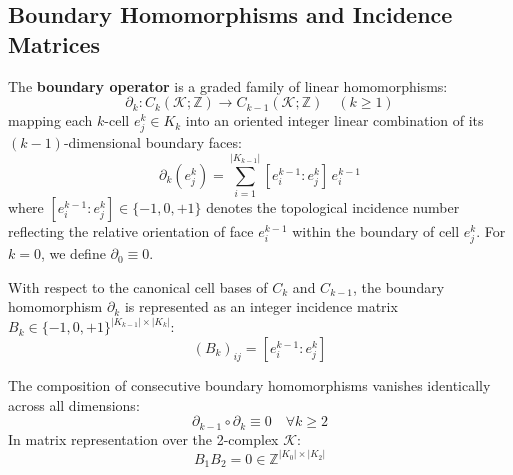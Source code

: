 \subsection{Boundary Homomorphisms and Incidence Matrices}
\begin{definition}
The \textbf{boundary operator} is a graded family of linear homomorphisms:
\begin{equation}
    \partial_k : C_k(\mathcal{K}; \mathbb{Z}) \longrightarrow C_{k-1}(\mathcal{K}; \mathbb{Z}) \quad (k \ge 1)
\end{equation}
mapping each $k$-cell $e_j^k \in K_k$ into an oriented integer linear combination of its $(k-1)$-dimensional boundary faces:
\begin{equation}
    \partial_k(e_j^k) = \sum_{i=1}^{|K_{k-1}|} [e_i^{k-1} : e_j^k] \, e_i^{k-1}
\end{equation}
where $[e_i^{k-1} : e_j^k] \in \{-1, 0, +1\}$ denotes the topological incidence number reflecting the relative orientation of face $e_i^{k-1}$ within the boundary of cell $e_j^k$. For $k=0$, we define $\partial_0 \equiv 0$.
\end{definition}

With respect to the canonical cell bases of $C_k$ and $C_{k-1}$, the boundary homomorphism $\partial_k$ is represented as an integer incidence matrix $B_k \in \{-1, 0, +1\}^{|K_{k-1}| \times |K_k|}$:
\begin{equation}
    (B_k)_{ij} = [e_i^{k-1} : e_j^k]
\end{equation}

\begin{axiom}
\label{ax:boundary_nilpotency}
The composition of consecutive boundary homomorphisms vanishes identically across all dimensions:
\begin{equation}
    \partial_{k-1} \circ \partial_k \equiv 0 \quad \forall k \ge 2
\end{equation}
In matrix representation over the 2-complex $\mathcal{K}$:
\begin{equation}
    B_1 B_2 = 0 \in \mathbb{Z}^{|K_0| \times |K_2|}
\end{equation}
\end{axiom}

